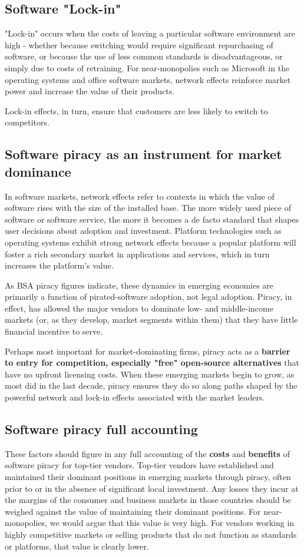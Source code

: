 \documentclass[times, utf8, seminar]{fit}
\begin{document}
\subsection{Software "Lock-in"}
"Lock-in" occurs when the costs of leaving a particular software environment are high - whether because switching would require significant repurchasing of software, or because the use of less common standards is disadvantageous, or simply due to costs of retraining. For near-monopolies such as Microsoft in the operating systems and office software markets, network effects reinforce market power and increase the value of their products.

Lock-in effects, in turn, ensure that customers are less likely to switch to competitors.

\subsection{Software piracy as an instrument for market dominance}  
In software markets, network effects refer to contexts in which the value of software rises with the size of the installed base. The more widely used piece of software or software service, the more it becomes a de facto standard that shapes user decisions about adoption and investment. Platform technologies such as operating systems exhibit strong network effects because a popular platform will foster a rich secondary market in applications and services, which in turn increases the platform’s value. 

As BSA piracy figures indicate, these dynamics in emerging economies are primarily a function of pirated-software adoption, not legal adoption. Piracy, in effect, has allowed the major vendors to dominate low- and middle-income markets (or, as they develop, market segments within them) that they have little financial incentive to serve. 

Perhaps most important for market-dominating firms, piracy acts as a \textbf{barrier to entry for competition, especially "free" open-source alternatives} that have no upfront licensing costs. When these emerging markets begin to grow, as most did in the last decade, piracy ensures they do so along paths shaped by the powerful network and lock-in effects associated with the market leaders.

\subsection{Software piracy full accounting}
These factors should figure in any full accounting of the \textbf{costs} and \textbf{benefits} of software piracy for top-tier vendors. Top-tier vendors have established and maintained their dominant positions in emerging markets through piracy, often prior to or in the absence of significant local investment. Any losses they incur at the margins of the consumer and business markets in those countries should be weighed against the value of maintaining their dominant positions. For near-monopolies, we would argue that this value is very high. For vendors working in highly competitive markets or selling products that do not function as standards or platforms, that value is clearly lower.\citep{mediapiracy}
\end{document}
